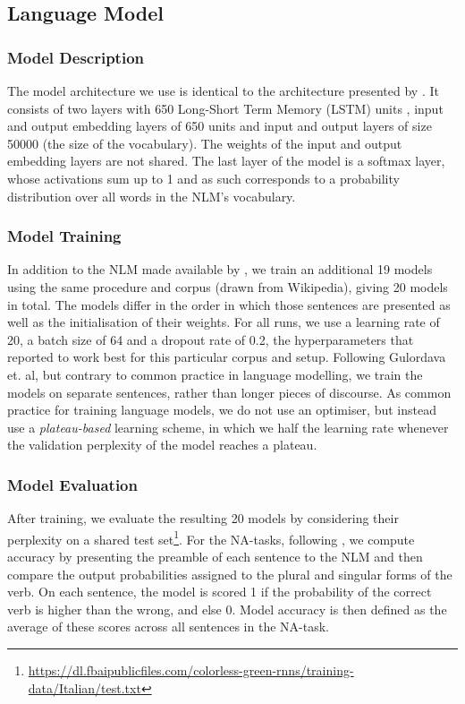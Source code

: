 \subsection{Language Model}
\subsubsection{Model Description}
The model architecture we use is identical to the architecture presented by \citet{Gulordava:etal:2018}. 
It consists of two layers with 650 Long-Short Term Memory (LSTM) units \citep{Hochreiter:Schmidhuber:1997}, input and output embedding layers of 650 units and input and output layers of size 50000 (the size of the vocabulary). The weights of the input and output embedding layers are not shared.
The last layer of the model is a softmax layer, whose activations sum up to 1 and as such corresponds to a probability distribution over all words in the NLM's vocabulary.

\subsubsection{Model Training} 
In addition to the NLM made available by \citet{Gulordava:etal:2018}, we train an additional 19 models using the same procedure and corpus (drawn from Wikipedia), giving 20 models in total. 
The models differ in the order in which those sentences are presented as well as the initialisation of their weights.
For all runs, we use a learning rate of 20, a batch size of 64 and a dropout rate of 0.2, the hyperparameters that \citet{Gulordava:etal:2018} reported to work best for this particular corpus and setup.
Following Gulordava et. al, but contrary to common practice in language modelling, we train the models on separate sentences, rather than longer pieces of discourse.
As common practice for training language models, we do not use an optimiser, but instead use a \emph{plateau-based} learning scheme, in which we half the learning rate whenever the validation perplexity of the model reaches a plateau.

\subsubsection{Model Evaluation} After training, we evaluate the resulting 20 models by considering their perplexity on a shared test set\footnote{\url{https://dl.fbaipublicfiles.com/colorless-green-rnns/training-data/Italian/test.txt}}. For the NA-tasks, following \citet{Linzen:etal:2016}, we compute accuracy by presenting the preamble of each sentence to the NLM and then compare the output probabilities assigned to the plural and singular forms of the verb. On each sentence, the model is scored 1 if the probability of the correct verb is higher than the wrong, and else 0. Model accuracy is then defined as the average of these scores across all sentences in the NA-task.

